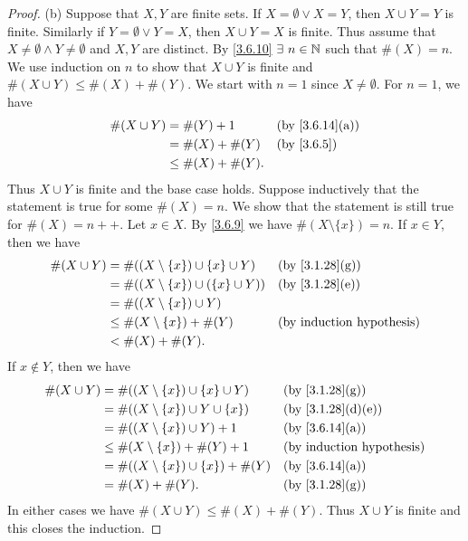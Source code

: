 \begin{proof}{(b)}
  Suppose that \(X, Y\) are finite sets.
  If \(X = \emptyset \lor X = Y\), then \(X \cup Y = Y\) is finite.
  Similarly if \(Y = \emptyset \lor Y = X\), then \(X \cup Y = X\) is finite.
  Thus assume that \(X \neq \emptyset \land Y \neq \emptyset\) and \(X, Y\) are distinct.
  By \cref{3.6.10} \(\exists\ n \in \N\) such that \(\#(X) = n\).
  We use induction on \(n\) to show that \(X \cup Y\) is finite and \(\#(X \cup Y) \leq \#(X) + \#(Y)\).
  We start with \(n = 1\) since \(X \neq \emptyset\).
  For \(n = 1\), we have
  \begin{align*}
    \#(X \cup Y) & = \#(Y) + 1         &  & \text{(by \cref{3.6.14}(a))} \\
                 & = \#(X) + \#(Y)     &  & \by{3.6.5}                   \\
                 & \leq \#(X) + \#(Y).
  \end{align*}
  Thus \(X \cup Y\) is finite and the base case holds.
  Suppose inductively that the statement is true for some \(\#(X) = n\).
  We show that the statement is still true for \(\#(X) = n++\).
  Let \(x \in X\).
  By \cref{3.6.9} we have \(\#(X \setminus \{x\}) = n\).
  If \(x \in Y\), then we have
  \begin{align*}
    \#(X \cup Y) & = \#((X \setminus \{x\}) \cup \{x\} \cup Y)   &  & \text{(by \cref{3.1.28}(g))} \\
                 & = \#((X \setminus \{x\}) \cup (\{x\} \cup Y)) &  & \text{(by \cref{3.1.28}(e))} \\
                 & = \#((X \setminus \{x\}) \cup Y)                                                \\
                 & \leq \#(X \setminus \{x\}) + \#(Y)            &  & \byIH                        \\
                 & < \#(X) + \#(Y).
  \end{align*}
  If \(x \notin Y\), then we have
  \begin{align*}
    \#(X \cup Y) & = \#((X \setminus \{x\}) \cup \{x\} \cup Y)  &  & \text{(by \cref{3.1.28}(g))}    \\
                 & = \#((X \setminus \{x\}) \cup Y \cup \{x\})  &  & \text{(by \cref{3.1.28}(d)(e))} \\
                 & = \#((X \setminus \{x\}) \cup Y) + 1         &  & \text{(by \cref{3.6.14}(a))}    \\
                 & \leq \#(X \setminus \{x\}) + \#(Y) + 1       &  & \byIH                           \\
                 & = \#((X \setminus \{x\}) \cup \{x\}) + \#(Y) &  & \text{(by \cref{3.6.14}(a))}    \\
                 & = \#(X) + \#(Y).                             &  & \text{(by \cref{3.1.28}(g))}
  \end{align*}
  In either cases we have \(\#(X \cup Y) \leq \#(X) + \#(Y)\).
  Thus \(X \cup Y\) is finite and this closes the induction.


\end{proof}
